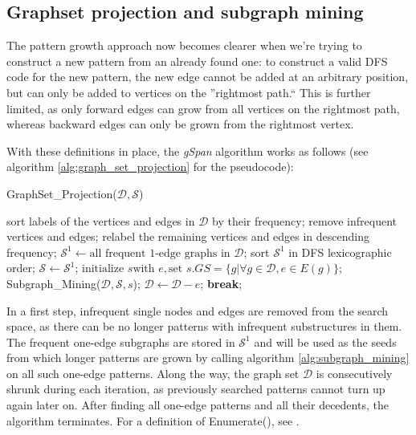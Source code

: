 \documentclass[pdftex,12pt,a4paper]{report}
\begin{document}
\subsection{Graphset projection and subgraph mining}
The pattern growth approach now becomes clearer when we're trying to construct a new pattern from an already found one: to construct a valid DFS code for the new pattern, the new edge cannot be added at an arbitrary position, but can only be added to vertices on the ''rightmost path.`` This is further limited, as only forward edges can grow from all vertices on the rightmost path, whereas backward edges can only be grown from the rightmost vertex.

With these definitions in place, the \textit{gSpan} algorithm works as follows (see algorithm \ref{alg:graph_set_projection} for the pseudocode):

\begin{algorithm}
	\caption[GraphSet\_Projection($\mathcal{D,S}$)]{GraphSet\_Projection($\mathcal{D,S}$)\cite{Yan2002-hg}}
	\label{alg:graph_set_projection}
	\begin{algorithmic}[1]
		\State sort labels of the vertices and edges in $\mathcal D$ by their frequency;
		\State remove infrequent vertices and edges;
		\State relabel the remaining vertices and edges in descending frequency;
		\State $\mathcal S^1 \gets \text{all frequent 1-edge graphs in } \mathcal D$;
		\State sort $\mathcal S^1$ in DFS lexicographic order;
		\State $\mathcal S \gets \mathcal S^1$;
		\State $\text{initialize } s \text{with } e, \text{set } s.GS = \{g | \forall g \in \mathcal D, e \in E(g)\}$;
		\State Subgraph\_Mining($\mathcal{D, S}, s$);
		\State $\mathcal D \gets \mathcal D - e$;
		\State \textbf{break};
		\EndIf
		\EndFor
	\end{algorithmic}
\end{algorithm}

In a first step, infrequent single nodes and edges are removed from the search space, as there can be no longer patterns with infrequent substructures in them. The frequent one-edge subgraphs are stored in $\mathcal S^1$ and will be used as the seeds from which longer patterns are grown by calling algorithm \ref{alg:subgraph_mining} on all such one-edge patterns. Along the way, the graph set $\mathcal{D}$ is consecutively shrunk during each iteration, as previously searched patterns cannot turn up again later on. After finding all one-edge patterns and all their decedents, the algorithm terminates. For a definition of Enumerate(), see \cite{Yan2002-hg}.
\end{document}
